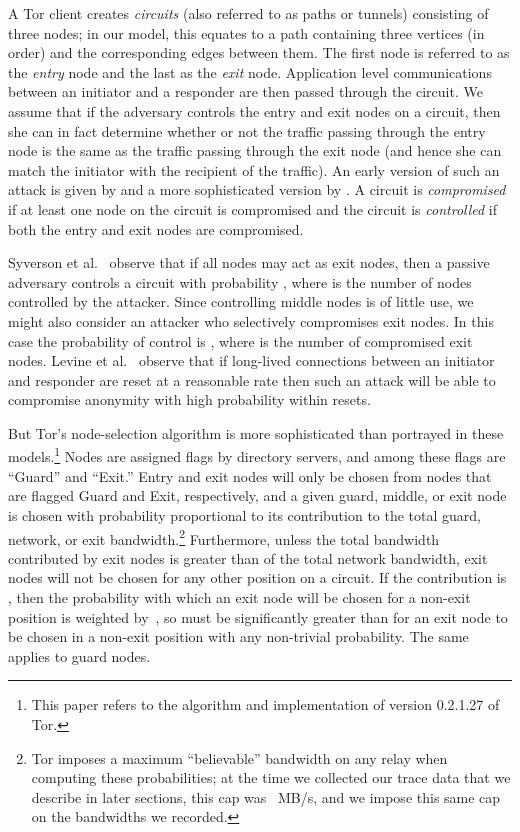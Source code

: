 \documentclass[]{lmcs}
\let\citeN\citet
\begin{document}
A Tor client creates 
\emph{circuits} (also referred to as paths or tunnels) consisting of three
nodes;
in our model, this equates to  a path containing 
three vertices (in order) and the corresponding edges between them.  
The first node is referred to as the \emph{entry} node and the
last as the \emph{exit} node.
Application level communications between an initiator and a responder
are then passed through the circuit.  We
assume that 
if the adversary controls the entry and exit nodes on a circuit,
then she can in fact determine whether or not the traffic passing through the
entry node is the same as the traffic passing through the exit node
(and hence she can match the initiator with the recipient of the traffic).
An early version of such an attack is given by
\citeN{timing-fc2004} and a more sophisticated version 
by \citeN{murdoch-zielinski:pet2007}.
A circuit is \emph{compromised} if 
at least one node on the circuit is compromised
and the circuit is
\emph{controlled} if both the entry and exit nodes are compromised.

Syverson et al.~\citeyearpar{syverson-pet00} observe that 
if all nodes may act as exit nodes, then
a passive adversary controls a circuit with probability
, where  is the
number of nodes controlled by the attacker.  Since controlling
middle nodes is of little use, we might also consider an attacker
who selectively compromises exit nodes.  In this case
the probability of control is
, where  is the number of compromised exit nodes.
Levine et al.~\citeyearpar{timing-fc2004} observe that if long-lived connections
between an initiator and responder are reset at a reasonable rate then
such an attack will be able to compromise anonymity with high probability
within  resets.

But Tor's node-selection algorithm is more sophisticated than
portrayed in these models.\footnote{This paper
refers to the algorithm and implementation of version 0.2.1.27 of Tor.}
Nodes are assigned flags by directory servers, and among these
flags are ``Guard'' and ``Exit.''  Entry and exit nodes will only be chosen
from nodes that are flagged Guard and Exit, respectively, and
a given guard, middle, or exit node is chosen with probability proportional to
its contribution to the total guard, network, or exit bandwidth.\footnote{Tor imposes a maximum ``believable'' bandwidth on any relay
when computing these probabilities; at the time we collected our
trace data that
we describe in later sections, this cap was ~MB/s, and we impose
this same cap on the bandwidths we recorded.}
Furthermore, unless the total bandwidth
contributed by exit nodes is greater than  of the total network
bandwidth, exit nodes will not be chosen for any other position on a
circuit.  If the contribution is
, then the probability with which an exit node will
be chosen for a non-exit position is weighted by~, so  must
be significantly greater than  for an exit node to be chosen in a
non-exit position with any non-trivial probability.  The same applies
to guard nodes.
\end{document}
